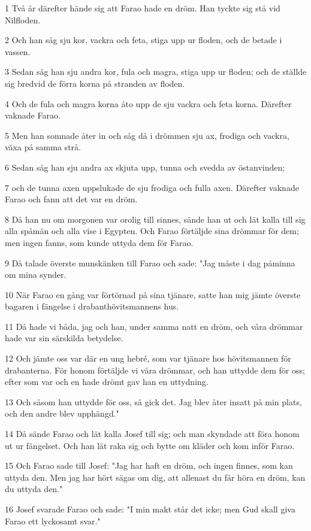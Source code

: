 \par 1 Två år därefter hände sig att Farao hade en dröm. Han tyckte sig stå vid Nilfloden.
\par 2 Och han såg sju kor, vackra och feta, stiga upp ur floden, och de betade i vassen.
\par 3 Sedan såg han sju andra kor, fula och magra, stiga upp ur floden; och de ställde sig bredvid de förra korna på stranden av floden.
\par 4 Och de fula och magra korna åto upp de sju vackra och feta korna. Därefter vaknade Farao.
\par 5 Men han somnade åter in och såg då i drömmen sju ax, frodiga och vackra, växa på samma strå.
\par 6 Sedan såg han sju andra ax skjuta upp, tunna och svedda av östanvinden;
\par 7 och de tunna axen uppslukade de sju frodiga och fulla axen. Därefter vaknade Farao och fann att det var en dröm.
\par 8 Då han nu om morgonen var orolig till sinnes, sände han ut och lät kalla till sig alla spåmän och alla vise i Egypten. Och Farao förtäljde sina drömmar för dem; men ingen fanns, som kunde uttyda dem för Farao.
\par 9 Då talade överste munskänken till Farao och sade: "Jag måste i dag påminna om mina synder.
\par 10 När Farao en gång var förtörnad på sina tjänare, satte han mig jämte överste bagaren i fängelse i drabanthövitsmannens hus.
\par 11 Då hade vi båda, jag och han, under samma natt en dröm, och våra drömmar hade var sin särskilda betydelse.
\par 12 Och jämte oss var där en ung hebré, som var tjänare hos hövitsmannen för drabanterna. För honom förtäljde vi våra drömmar, och han uttydde dem för oss; efter som var och en hade drömt gav han en uttydning.
\par 13 Och såsom han uttydde för oss, så gick det. Jag blev åter insatt på min plats, och den andre blev upphängd."
\par 14 Då sände Farao och lät kalla Josef till sig; och man skyndade att föra honom ut ur fängelset. Och han lät raka sig och bytte om kläder och kom inför Farao.
\par 15 Och Farao sade till Josef: "Jag har haft en dröm, och ingen finnes, som kan uttyda den. Men jag har hört sägas om dig, att allenast du får höra en dröm, kan du uttyda den."
\par 16 Josef svarade Farao och sade: "I min makt står det icke; men Gud skall giva Farao ett lyckosamt svar."
